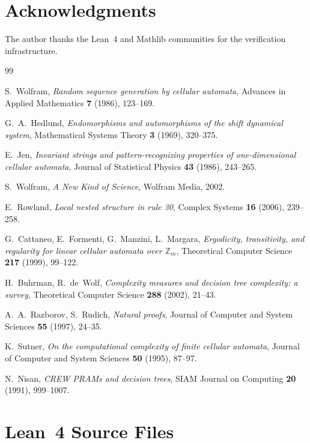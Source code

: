 \documentclass[11pt]{article}
\theoremstyle{plain}
\theoremstyle{definition}
\begin{document}
\section*{Acknowledgments}

The author thanks the Lean~4 and Mathlib communities for the verification infrastructure.

\begin{thebibliography}{99}

S.~Wolfram,
\emph{Random sequence generation by cellular automata},
Advances in Applied Mathematics \textbf{7} (1986), 123--169.

G.~A.~Hedlund,
\emph{Endomorphisms and automorphisms of the shift dynamical system},
Mathematical Systems Theory \textbf{3} (1969), 320--375.

E.~Jen,
\emph{Invariant strings and pattern-recognizing properties of one-dimensional cellular automata},
Journal of Statistical Physics \textbf{43} (1986), 243--265.

S.~Wolfram,
\emph{A New Kind of Science},
Wolfram Media, 2002.

E.~Rowland,
\emph{Local nested structure in rule 30},
Complex Systems \textbf{16} (2006), 239--258.

G.~Cattaneo, E.~Formenti, G.~Manzini, L.~Margara,
\emph{Ergodicity, transitivity, and regularity for linear cellular automata over $\mathbb{Z}_m$},
Theoretical Computer Science \textbf{217} (1999), 99--122.

H.~Buhrman, R.~de~Wolf,
\emph{Complexity measures and decision tree complexity: a survey},
Theoretical Computer Science \textbf{288} (2002), 21--43.

A.~A.~Razborov, S.~Rudich,
\emph{Natural proofs},
Journal of Computer and System Sciences \textbf{55} (1997), 24--35.

K.~Sutner,
\emph{On the computational complexity of finite cellular automata},
Journal of Computer and System Sciences \textbf{50} (1995), 87--97.

N.~Nisan,
\emph{CREW PRAMs and decision trees},
SIAM Journal on Computing \textbf{20} (1991), 999--1007.

\end{thebibliography}

\appendix

\section{Lean~4 Source Files}
\end{document}
